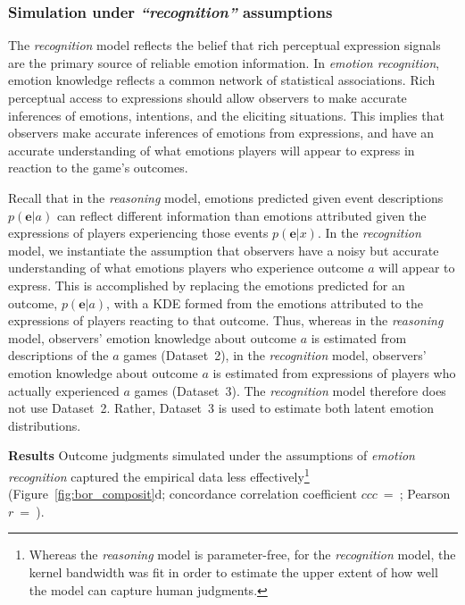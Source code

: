 \documentclass[10pt,letterpaper]{article}
\begin{document}
\subsubsection{\large Simulation under {\em ``recognition''} assumptions}

The {\em recognition} model reflects the belief that rich perceptual expression signals are the primary source of reliable emotion information. 
In {\em emotion recognition}, emotion knowledge reflects a common network of statistical associations. Rich perceptual access to expressions should allow observers to make accurate inferences of emotions, intentions, and the eliciting situations. 
This implies that observers make accurate inferences of emotions from expressions, and have an accurate understanding of what emotions players will appear to express in reaction to the game's outcomes.


Recall that in the {\em reasoning} model, emotions predicted given event descriptions \( p(\bm{e}|a) \) can reflect different information than emotions attributed given the expressions of players experiencing those events \( p(\bm{e}|x) \).
In the {\em recognition} model, we instantiate the assumption that observers have a noisy but accurate understanding of what emotions players who experience outcome $a$ will appear to express. 
This is accomplished by
replacing the emotions predicted for an outcome, \( p(\bm{e}|a) \), with a KDE formed from the emotions attributed to the expressions of players reacting to that outcome.
Thus, whereas in the {\em reasoning} model, observers' emotion knowledge about outcome $a$ is estimated from descriptions of the $a$ games (Dataset~2),
in the {\em recognition} model, observers' emotion knowledge about outcome $a$ is estimated from expressions of players who actually experienced $a$ games (Dataset~3). 
The {\em recognition} model therefore does not use Dataset~2. 
Rather, Dataset~3 is used to estimate both latent emotion distributions.


\vspace{1 mm}
\noindent\textbf{Results}
Outcome judgments simulated under the assumptions of {\em emotion recognition}
captured the empirical data less effectively\footnote{
Whereas the {\em reasoning} model is parameter-free, for the {\em recognition} model, the kernel bandwidth was fit in order to estimate the upper extent of how well the model can capture human judgments.
}
(Figure~\ref{fig:bor_composit}d; concordance correlation coefficient $ccc$~=~; Pearson $r$~=~). 
\end{document}

